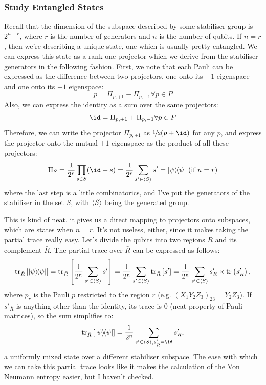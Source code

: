 \documentclass[10pt,a4paper, english]{scrartcl}
\begin{document}
\subsubsection{Study Entangled States}
Recall that the dimension of the subspace described by some stabiliser group is $2^{n-r}$, where $r$ is the number of generators and $n$ is the number of qubits. 
If $n=r$, then we're describing a unique state, one which is usually pretty entangled. 
We can express this state as a rank-one projector which we derive from the stabiliser generators in the following fashion. 
First, we note that each Pauli can be expressed as the difference between two projectors, one onto its $+1$ eigenspace and one onto its $-1$ eigenspace:
\begin{equation}
p = \Pi_{p,+1} - \Pi_{p,-1} \forall p \in P 
\end{equation}
Also, we can express the identity as a sum over the same projectors:
\begin{equation}
\id = \Pi_{p,+1} + \Pi_{p,-1} \forall p \in P 
\end{equation}
Therefore, we can write the projector $\Pi_{p,+1}$ as $\nicefrac{1}{2}(p + \id)$ for any $p$, and express the projector onto the mutual $+1$ eigenspace as the product of all these projectors:
\begin{equation}
\Pi_S = \frac{1}{2^r}\prod_{s \in S} (\id + s) = \frac{1}{2^r}\sum_{s' \in \group{S}} s' = \proj{\psi} \textrm{ (if $n=r$)}
\end{equation}
where the last step is a little combinatorics, and I've put the generators of the stabiliser in the set $S$, with $\left \langle S \right \rangle$ being the generated group. 

This is kind of neat, it gives us a direct mapping to projectors onto subspaces, which are states when $n=r$. 
It's not useless, either, since it makes taking the partial trace really easy. 
Let's divide the qubits into two regions $R$ and its complement $\bar{R}$.
The partial trace over $\bar{R}$ can be expressed as follows:
\begin{equation}
\mathrm{tr}_{\bar{R}} \left[ {\left\vert{\psi}\right\rangle} \! {\left\langle{\psi}\right\vert} \right] = \mathrm{tr}_{\bar{R}} \left[ \frac{1}{2^n}\sum_{s' \in \left \langle S \right \rangle} s' \right] = \frac{1}{2^n} \sum_{s' \in \left \langle S \right \rangle} \mathrm{tr}_{\bar{R}} \left[ s' \right] = \frac{1}{2^n} \sum_{s' \in \left \langle S \right \rangle} s'_R \times \mathrm{tr} \left( s'_{\bar{R}} \right),
\end{equation}
where $p_r$ is the Pauli $p$ restricted to the region $r$ (e.g. $(X_1 Y_2 Z_3)_{23} = Y_2 Z_3$). 
If $s'_{\bar{R}}$ is anything other than the identity, its trace is 0 (neat property of Pauli matrices), so the sum simplifies to:
\begin{equation}
\tr_{\bar{R}} \left[ \proj{\psi} \right] = \frac{1}{2^n} \sum_{s' \in \group{S}, s'_{\bar{R}}=\id } s'_R, 
\end{equation}
a uniformly mixed state over a different stabiliser subspace. 
The ease with which we can take this partial trace looks like it makes the calculation of the Von Neumann entropy easier, but I haven't checked.
\end{document}
